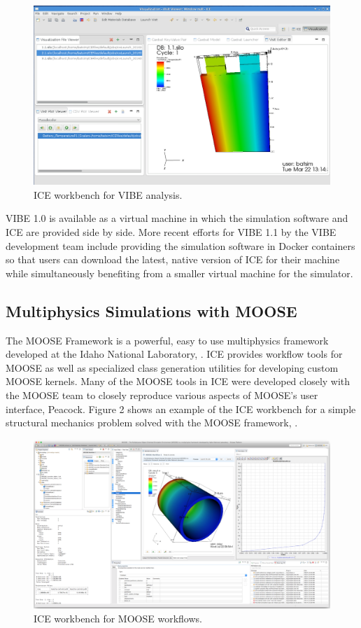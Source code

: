 \begin{figure}[htbp]
\centering
\includegraphics[width=\textwidth]{images/vibe_20151016.png}
\caption{ICE workbench for VIBE analysis.}
\end{figure}

VIBE 1.0 is available as a virtual machine in which the simulation
software and ICE are provided side by side. More recent efforts for VIBE
1.1 by the VIBE development team include providing the simulation
software in Docker containers so that users can download the latest,
native version of ICE for their machine while simultaneously benefiting
from a smaller virtual machine for the simulator.

\subsection{Multiphysics Simulations with
MOOSE}\label{multiphysics-simulations-with-moose}

The MOOSE Framework is a powerful, easy to use multiphysics framework
developed at the Idaho National Laboratory, \cite{gaston_moose:_2009}. ICE
provides workflow tools for MOOSE as well as specialized class
generation utilities for developing custom MOOSE kernels. Many of the
MOOSE tools in ICE were developed closely with the MOOSE team to closely
reproduce various aspects of MOOSE's user interface, Peacock. Figure 2
shows an example of the ICE workbench for a simple structural mechanics
problem solved with the MOOSE framework, \cite{mccaskey_scientific_2015}.

\begin{figure}[htbp]
\centering
\includegraphics[width=\textwidth]{images/ice-moose.png}
\caption{ICE workbench for MOOSE workflows.}
\end{figure}

